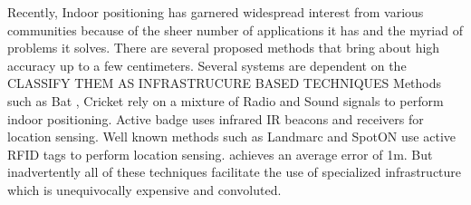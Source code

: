 \documentclass[twocolumn, 11pt]{IEEEtran}
\begin{document}



Recently, Indoor positioning has garnered widespread interest from various communities because of the sheer number of applications it has and the myriad of problems it solves.
There are several proposed methods that bring about high accuracy up to a few centimeters.\cite{CITATION NEEDED}
Several systems are dependent on the 
{CLASSIFY THEM AS INFRASTRUCURE BASED TECHNIQUES}
Methods such as Bat \cite{barshan1992bat}, Cricket \cite{priyantha2000cricket} rely on a mixture of Radio and Sound signals to perform indoor positioning. Active badge \cite{want1992active} uses infrared IR beacons and receivers for location sensing. 
Well known methods such as Landmarc \cite{ni2004landmarc} and SpotON \cite{ hightower2000spoton} use active RFID tags to perform location sensing. \cite{ni2004landmarc} achieves an average error of 1m. But inadvertently all of these techniques facilitate the use of specialized infrastructure which is unequivocally expensive and convoluted.
\end{document}
